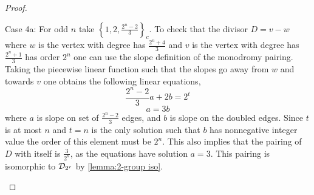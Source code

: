 \documentclass{amsart}
\begin{document}
\begin{proof}
\begin{center}
\end{center}
    
    Case 4a: For odd $n$ take $\left\{1, 2,
\frac{2^{n}-2}{3}\right\}_{c}$. To check that the divisor
$D=v-w$ where $w$ is the vertex with degree has $\frac{2^{n}+4}{3}$ and
$v$ is the vertex with degree has $\frac{2^{n}+1}{3}$ has order
$2^{n}$ one can use the slope definition of the monodromy pairing. Taking the piecewise linear function such that the slopes go away from $w$ and towards $v$ one
obtains the following linear equations,
\begin{equation*}
\frac{2^{n}-2}{3}a+2b=2^{t}
\end{equation*}
\begin{equation*}
a=3b
\end{equation*}
where $a$ is slope on set of $\frac{2^{n}-2}{3}$ edges, and
$b$ is slope on the doubled edges. Since $t$ is at most $n$ and $t=n$ is the only solution such that $b$ has nonnegative integer value the order of this element must be $2^{n}$. This also implies that the pairing of $D$ with itself is $\frac{3}{2^{n}}$, as the equations have solution $a=3$. This pairing is isomorphic to
$\mathcal{D}_{2^{r}}$ by  \ref{lemma:2-group iso}.

\begin{center}
\end{center}
\end{proof}
\end{document}
